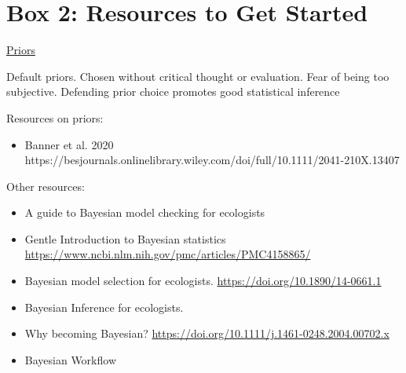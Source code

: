 \documentclass{article}
\begin{document}
% 


\section* {Box 2: Resources to Get Started}
\underline{Priors}
\par Default priors. Chosen without critical thought or evaluation. Fear of being too subjective. Defending prior choice promotes good statistical inference
\par Resources on priors: 

\begin{itemize}
\item Banner et al. 2020 https://besjournals.onlinelibrary.wiley.com/doi/full/10.1111/2041-210X.13407 
\end{itemize}

\par Other resources:
\begin{itemize}
\item A guide to Bayesian model checking for ecologists \citep{conn2018guide}
\item Gentle Introduction to Bayesian statistics \citep{van2014gentle}
\href{https://www.ncbi.nlm.nih.gov/pmc/articles/PMC4158865/}{https://www.ncbi.nlm.nih.gov/pmc/articles/PMC4158865/}
\item Bayesian model selection for ecologists. \citep{hooten2015guide}
 \href{https://doi.org/10.1890/14-0661.1}{https://doi.org/10.1890/14-0661.1}
\item Bayesian Inference for ecologists. \citep{elis2004}
\item Why becoming Bayesian? \citep{clark2005environmental}
 \href{https://doi.org/10.1111/j.1461-0248.2004.00702.x}{https://doi.org/10.1111/j.1461-0248.2004.00702.x}
\item Bayesian Workflow \citep{gelman2020bayesia}

\end{itemize}
 
\end{document}
